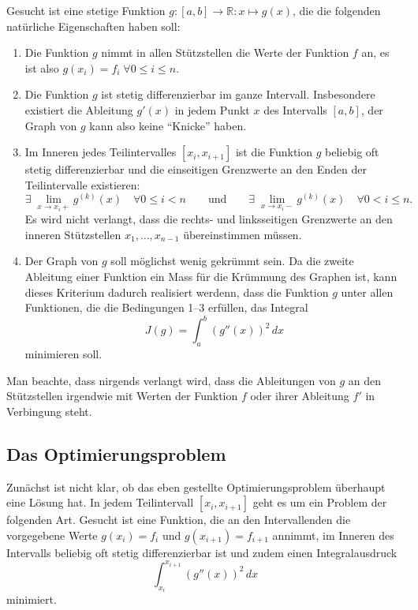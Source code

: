 Gesucht ist eine stetige Funktion $g\colon[a,b]\to\mathbb R:x\mapsto g(x)$,
die die folgenden natürliche Eigenschaften haben soll:
\begin{enumerate}
\item
Die Funktion $g$ nimmt in allen Stützstellen die Werte der Funktion
$f$ an, es ist also $g(x_i)=f_i\;\forall 0\le i\le n$.
\item
Die Funktion $g$ ist stetig differenzierbar im ganze Intervall.
Insbesondere existiert die Ableitung $g'(x)$ in jedem Punkt $x$ des
Intervalls $[a,b]$, der Graph von $g$ kann also keine ``Knicke'' haben.
\item
Im Inneren jedes Teilintervalles $[x_i,x_{i+1}]$ ist die Funktion $g$
beliebig oft stetig differenzierbar und die einseitigen Grenzwerte 
an den Enden der Teilintervalle existieren:
\[
\exists\; \lim_{x\to x_i+} g^{(k)}(x) \quad\forall 0\le i < n
\qquad\text{und}\qquad
\exists\; \lim_{x\to x_i-} g^{(k)}(x) \quad\forall 0< i \le n.
\]
Es wird nicht verlangt, dass die rechts- und linksseitigen Grenzwerte
an den inneren Stützstellen $x_1,\dots,x_{n-1}$ übereinstimmen müssen.
\item
Der Graph von $g$ soll möglichst wenig gekrümmt sein.
Da die zweite Ableitung einer Funktion ein Mass für die Krümmung des 
Graphen ist, kann dieses Kriterium dadurch realisiert werdenn, dass
die Funktion $g$ unter allen Funktionen, die die Bedingungen 1--3 erfüllen,
das Integral
\[
J(g)
=
\int_a^b (g''(x) )^2\,dx
\]
minimieren soll.
\end{enumerate}

Man beachte, dass nirgends verlangt wird, dass die Ableitungen von $g$
an den Stützstellen irgendwie mit Werten der Funktion $f$ oder ihrer
Ableitung $f'$ in Verbingung steht.

%
%
\subsection{Das Optimierungsproblem
\label{buch:subsection:variation}}
%
Zunächst ist nicht klar, ob das eben gestellte Optimierungsproblem überhaupt
eine Lösung hat. 
In jedem Teilintervall $[x_i,x_{i+1}]$ geht es um ein Problem der
folgenden Art.
Gesucht ist eine Funktion, die an den Intervallenden die vorgegebene
Werte $g(x_i)=f_i$ und $g(x_{i+1})=f_{i+1}$ annimmt, im Inneren des
Intervalls beliebig oft stetig differenzierbar ist und zudem einen
Integralausdruck
\[
\int_{x_i}^{x_{i+1}} (g''(x))^2\,dx
\]
minimiert.

